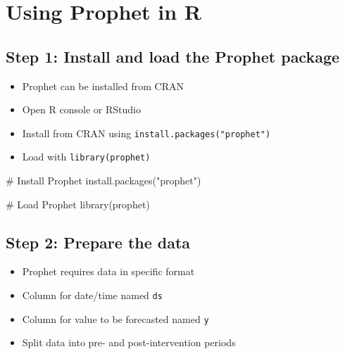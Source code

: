 \documentclass[
  letterpaper,
  DIV=11,
  numbers=noendperiod]{scrartcl}
\newenvironment{Shaded}{\begin{snugshade}}{\end{snugshade}}
\newcommand{\CommentTok}[1]{\textcolor[rgb]{0.37,0.37,0.37}{#1}}
\newcommand{\FunctionTok}[1]{\textcolor[rgb]{0.28,0.35,0.67}{#1}}
\newcommand{\NormalTok}[1]{\textcolor[rgb]{0.00,0.23,0.31}{#1}}
\newcommand{\StringTok}[1]{\textcolor[rgb]{0.13,0.47,0.30}{#1}}
\providecommand{\tightlist}{%
  \setlength{\itemsep}{0pt}\setlength{\parskip}{0pt}}\usepackage{longtable,booktabs,array}
\begin{document}
\hypertarget{using-prophet-in-r}{%
\section{Using Prophet in R}\label{using-prophet-in-r}}

\hypertarget{step-1-install-and-load-the-prophet-package}{%
\subsection{Step 1: Install and load the Prophet
package}\label{step-1-install-and-load-the-prophet-package}}

\begin{itemize}
\tightlist
\item
  Prophet can be installed from CRAN
\item
  Open R console or RStudio
\item
  Install from CRAN using \texttt{install.packages("prophet")}
\item
  Load with \texttt{library(prophet)}
\end{itemize}

\begin{Shaded}
\begin{Highlighting}[]
\CommentTok{\# Install Prophet}
\FunctionTok{install.packages}\NormalTok{(}\StringTok{"prophet"}\NormalTok{)}

\CommentTok{\# Load Prophet}
\FunctionTok{library}\NormalTok{(prophet)}
\end{Highlighting}
\end{Shaded}

\hypertarget{step-2-prepare-the-data}{%
\subsection{Step 2: Prepare the data}\label{step-2-prepare-the-data}}

\begin{itemize}
\tightlist
\item
  Prophet requires data in specific format
\item
  Column for date/time named \texttt{ds}
\item
  Column for value to be forecasted named \texttt{y}
\item
  Split data into pre- and post-intervention periods
\end{itemize}
\end{document}

